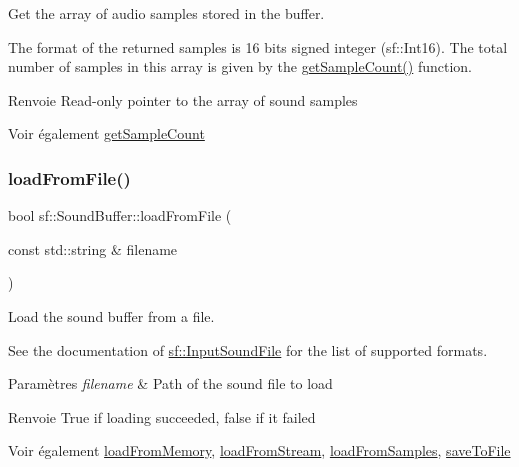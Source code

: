 Get the array of audio samples stored in the buffer. 

The format of the returned samples is 16 bits signed integer (sf\+::\+Int16). The total number of samples in this array is given by the \hyperlink{classsf_1_1SoundBuffer_aebe2a4bdbfbd9249353748da3f6a4fa1}{get\+Sample\+Count()} function.

\begin{DoxyReturn}{Renvoie}
Read-\/only pointer to the array of sound samples
\end{DoxyReturn}
\begin{DoxySeeAlso}{Voir également}
\hyperlink{classsf_1_1SoundBuffer_aebe2a4bdbfbd9249353748da3f6a4fa1}{get\+Sample\+Count} 
\end{DoxySeeAlso}
\mbox{\label{classsf_1_1SoundBuffer_a2be6a8025c97eb622a7dff6cf2594394}} 
\subsubsection{\texorpdfstring{load\+From\+File()}{loadFromFile()}}
{\footnotesize\ttfamily bool sf\+::\+Sound\+Buffer\+::load\+From\+File (\begin{DoxyParamCaption}\item[{const std\+::string \&}]{filename }\end{DoxyParamCaption})}



Load the sound buffer from a file. 

See the documentation of \hyperlink{classsf_1_1InputSoundFile}{sf\+::\+Input\+Sound\+File} for the list of supported formats.


\begin{DoxyParams}{Paramètres}
{\em filename} & Path of the sound file to load\\
\hline
\end{DoxyParams}
\begin{DoxyReturn}{Renvoie}
True if loading succeeded, false if it failed
\end{DoxyReturn}
\begin{DoxySeeAlso}{Voir également}
\hyperlink{classsf_1_1SoundBuffer_af8cfa5599739a7edae69c5cba273d33f}{load\+From\+Memory}, \hyperlink{classsf_1_1SoundBuffer_ad292156b1e01f6dabd4c0c277d5e079e}{load\+From\+Stream}, \hyperlink{classsf_1_1SoundBuffer_a42d51ce4bb3b60c7ea06f63c273fd063}{load\+From\+Samples}, \hyperlink{classsf_1_1SoundBuffer_aade64260c6375580a085314a30be007e}{save\+To\+File} 
\end{DoxySeeAlso}
\mbox{\label{classsf_1_1SoundBuffer_af8cfa5599739a7edae69c5cba273d33f}} 
